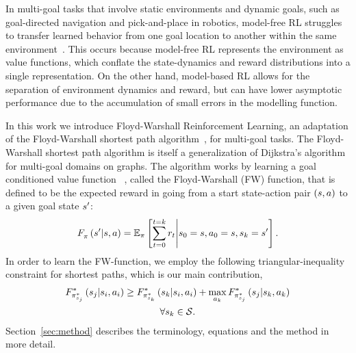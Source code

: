 In multi-goal tasks that involve static environments and dynamic goals,
such as goal-directed navigation and pick-and-place in robotics,
model-free RL struggles to transfer learned behavior from one goal
location to another within the same
environment~\citep{dhiman2018critical,quillen2018deep}. This occurs because model-free
RL represents the environment as value functions, which conflate the
state-dynamics and reward distributions into a single representation.
On the other hand, model-based RL allows for the separation of
environment dynamics and reward, but can have lower asymptotic
performance due to the accumulation of small errors in the modelling function.

In this work we introduce Floyd-Warshall Reinforcement Learning, an
adaptation of the Floyd-Warshall shortest path
algorithm~\citep{floydwarshall1962}, for multi-goal tasks.
The Floyd-Warshall shortest path algorithm is itself a generalization of
Dijkstra's algorithm for multi-goal domains on graphs. The algorithm works
by learning a goal conditioned value function
~\citep{schaul2015universal}, called the Floyd-Warshall (FW) function,
that is defined to be the expected reward in going from a start
state-action pair $(s, a)$ to a given goal state $s'$:
%
\begin{align}
F_{\pi}^{}\left({s'}\middle|{s}, {a}\right) =
\mathbb{E}_{\pi}\left[ \sum_{t=0}^{t=k} r_t \middle\vert s_0 = s, a_0 = s, s_k = s' \right] .
\end{align}%
%
In order to learn the FW-function, we employ the following
triangular-inequality constraint for shortest paths, which is our main
contribution,
%
\begin{multline}
\fwargs{\state_i}{\act_i}{\state_j}{\policy^*_{\state_j}}{*}
 \ge 
  \fwargs{\state_i}{\act_i}{\state_k}{\policy^*_{\state_k}}{*}
  + \max_{\act_k}\fwargs{\state_k}{\act_k}{\state_j}{\policy^*_{\state_j}}{*}
  \\
  \forall \state_k \in \State.
  \label{eq:fwconstraint}
\end{multline}%
%
Section~\ref{sec:method} describes the terminology, equations and the method in more detail.

